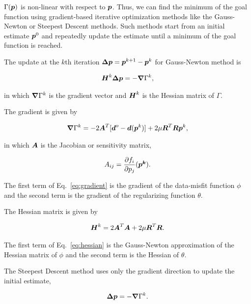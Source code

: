 \documentclass[extra]{gji}
\newcommand{\eq}[1]{Eq.~\ref{eq:#1}}
\newcommand{\mbf}[1]{\hbox{\mathversion{bold}$#1$}}
\begin{document}
\noindent $\Gamma(\mbf{p})$ is non-linear with respect to $\mbf{p}$.
Thus, we can find the minimum of the goal function using gradient-based
iterative optimization
methods like the Gauss-Newton or Steepest Descent methods.
Such methods start from an initial estimate $\mbf{p}^0$ and repeatedly update
the estimate until a minimum of the goal function is reached.

The update at the $k$th iteration $\mbf{\Delta p} = \mbf{p}^{k+1} - \mbf{p}^k$
for Gauss-Newton method is

\begin{equation}
    \mbf{H}^k\mbf{\Delta p} = -\mbf{\nabla}\Gamma^k,
\end{equation}

\noindent in which
$\mbf{\nabla}\Gamma^k$ is the gradient vector and
$\mbf{H}^k$ is the Hessian matrix of $\Gamma$.

The gradient is given by

\begin{equation}
    \mbf{\nabla}\Gamma^k =
    -2\mbf{A}^T[\mbf{d}^o - \mbf{d}(\mbf{p}^k)] +
    2\mu\mbf{R}^T\mbf{R}\mbf{p}^k,
    \label{eq:gradient}
\end{equation}

\noindent in which
$\mbf{A}$ is the Jacobian or sensitivity matrix,

\begin{equation}
    A_{ij} = \dfrac{\partial f_i}{\partial p_j}(\mbf{p^k}).
    \label{eq:jacobian}
\end{equation}

\noindent
The first term of \eq{gradient} is the gradient of the data-misfit
function $\phi$ and the second term is the gradient of the regularizing
function $\theta$.

The Hessian matrix is given by

\begin{equation}
    \mbf{H}^k = 2\mbf{A}^T\mbf{A} +
    2\mu\mbf{R}^T\mbf{R}.
    \label{eq:hessian}
\end{equation}

\noindent
The first term of \eq{hessian} is the Gauss-Newton approximation of the Hessian
matrix of $\phi$ and the second term is the Hessian of $\theta$.

The Steepest Descent method uses only the gradient direction to
update the initial estimate,

\begin{equation}
    \mbf{\Delta p} = -\mbf{\nabla}\Gamma^k.
\end{equation}
\end{document}
